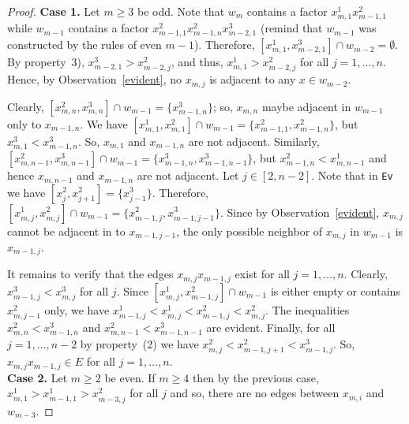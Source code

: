 \documentclass[10pt,a4paper]{amsart}
\begin{document}
\begin{proof}
\noindent
{\bf Case 1.} Let $m\ge 3$ be odd. Note that $w_m$ contains a factor  $ x_{m,1}^1x_{m-1,1}^2$ while $w_{m-1}$ contains a factor $x_{m-1,1}^2x_{m-1,n}^2x_{m-2,1}^3$ (remind that  $w_{m-1}$ was constructed by the rules of even $m-1$). Therefore, $[x_{m,1}^1,x_{m-2,1}^3]\cap w_{m-2}=\emptyset.$ By property~3), $x_{m-2,1}^3>x_{m-2,j}^2$, and thus,
 $x_{m,1}^1>x_{m-2,j}^2$ for all $j=1,\ldots,n$. Hence, by Observation~\ref{evident}, no $x_{m,j}$ is adjacent to any $x\in w_{m-2}$.

Clearly, $[x_{m,n}^2,x_{m,n}^3]\cap w_{m-1}=\{x_{m-1,n}^3\}$; so, $x_{m,n}$ maybe adjacent in $w_{m-1}$ only to $x_{m-1,n}$. We have $[x_{m,1}^1,x_{m,1}^2]\cap w_{m-1} =
\{ x_{m-1,1}^2,x_{m-1,n}^2 \}$, but $x_{m,1}^3<x_{m-1,n}^3$. So, $x_{m,1}$ and $x_{m-1,n}$ are not adjacent. Similarly, 
$[x_{m,n-1}^2,x_{m,n-1}^3]\cap w_{m-1} = \{ x_{m-1,n}^3,x_{m-1,n-1}^3 \}$, but $x_{m-1,n}^2<x_{m,n-1}^1$ and hence  $x_{m,n-1}$ and $x_{m-1,n}$ are not adjacent. 
Let $j\in [2,n-2]$. Note that in  \texttt{Ev} we have $[x_j^2,x_{j+1}^2] =\{ x_{j-1}^3\}$. Therefore, $[x_{m,j}^1,x_{m,j}^2]\cap w_{m-1} =\{ x_{m-1,j}^2,x_{m-1,j-1}^3\}$.
Since by Observation~\ref{evident}, $x_{m,j}$ cannot be adjacent in to $x_{m-1,j-1}$, the only possible neighbor of  $x_{m,j}$ in $w_{m-1}$ is $x_{m-1,j}$.

It remains to verify that the edges $x_{m,j}x_{m-1,j}$ exist for all $j=1,\ldots,n$. Clearly,  $x_{m-1,j}^3<x_{m,j}^3$ for all $j$. Since
$[x_{m,j}^1,x_{m-1,j}^2]\cap w_{m-1}$ is either empty or contains $x_{m,j-1}^2$ only, we have $x_{m-1,j}^1<x_{m,j}^1<x_{m-1,j}^2<x_{m,j}^2$. 
The inequalities $x_{m,n}^2<x_{m-1,n}^3$ and  $x_{m,n-1}^2<x_{m-1,n-1}^3$ are evident. Finally, for all $j=1,\ldots,n-2$ by property~(2) we have
$x_{m,j}^2<x_{m-1,j+1}^2<x_{m-1,j}^3$.  So, $x_{m,j}x_{m-1,j}\in E$  for all $j=1,\ldots, n$. \\[-3mm]

\noindent
{\bf Case 2. } Let $m\ge 2$ be even. If $m\ge 4$ then by the previous case, $x_{m,1}^1>x_{m-1,1}^1>x_{m-3,j}^2$ for all $j$ and so, there are no edges between 
 $x_{m,i}$ and $w_{m-3}$. 


\end{proof}
\end{document}
